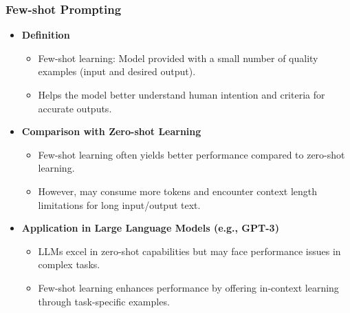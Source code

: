\begin{frame}[fragile]\frametitle{Few-shot Prompting}

\begin{itemize}
  \item \textbf{Definition}
    \begin{itemize}
      \item Few-shot learning: Model provided with a small number of quality examples (input and desired output).
      \item Helps the model better understand human intention and criteria for accurate outputs.
    \end{itemize}

  \item \textbf{Comparison with Zero-shot Learning}
    \begin{itemize}
      \item Few-shot learning often yields better performance compared to zero-shot learning.
      \item However, may consume more tokens and encounter context length limitations for long input/output text.
    \end{itemize}

  \item \textbf{Application in Large Language Models (e.g., GPT-3)}
    \begin{itemize}
      \item LLMs excel in zero-shot capabilities but may face performance issues in complex tasks.
      \item Few-shot learning enhances performance by offering in-context learning through task-specific examples.
    \end{itemize}

\end{itemize}

\end{frame}

